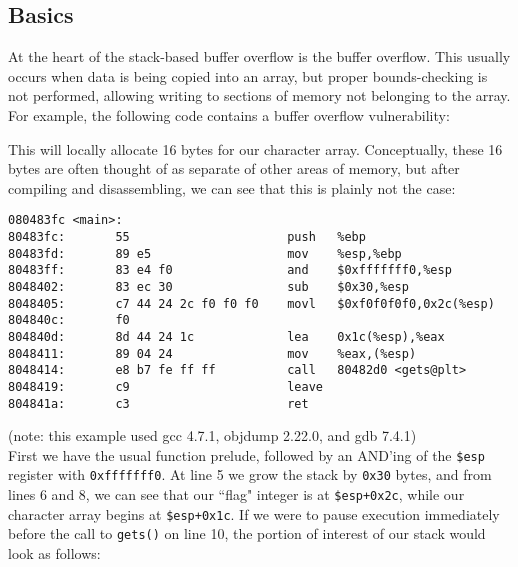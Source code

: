 \subsection{Basics}
At the heart of the stack-based buffer overflow is the buffer overflow. This usually 
occurs when data is being copied into an array, but proper bounds-checking is not performed,
allowing writing to sections of memory not belonging to the array. For example, the
following code contains a buffer overflow vulnerability:

This will locally allocate 16 bytes for our character array. Conceptually, these 16 bytes
are often thought of as separate of other areas of memory, but after compiling and disassembling,
we can see that this is plainly not the case:
\begin{lstlisting}
080483fc <main>:
80483fc:       55                      push   %ebp
80483fd:       89 e5                   mov    %esp,%ebp
80483ff:       83 e4 f0                and    $0xfffffff0,%esp
8048402:       83 ec 30                sub    $0x30,%esp
8048405:       c7 44 24 2c f0 f0 f0    movl   $0xf0f0f0f0,0x2c(%esp)
804840c:       f0 
804840d:       8d 44 24 1c             lea    0x1c(%esp),%eax
8048411:       89 04 24                mov    %eax,(%esp)
8048414:       e8 b7 fe ff ff          call   80482d0 <gets@plt>
8048419:       c9                      leave  
804841a:       c3                      ret    
\end{lstlisting}

\small{(note: this example used gcc 4.7.1, objdump 2.22.0, and gdb 7.4.1)}\normalsize\\

First we have the usual function prelude, followed by an AND'ing of the \texttt{\$esp} register with \texttt{0xfffffff0}.
At line 5 we grow the stack by \texttt{0x30} bytes, and from lines 6 and 8, we can see that our ``flag" integer
is at \texttt{\$esp+0x2c}, while our character array begins at \texttt{\$esp+0x1c}. If we were to pause execution
immediately before the call to \texttt{gets()} on line 10, the portion of interest of our stack would look as follows:

